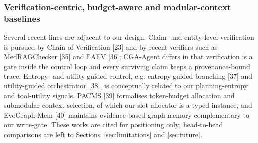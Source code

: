 \documentclass[journal,10pt,a4paper]{IEEEtran}
\begin{document}
\subsubsection{Verification-centric, budget-aware and modular-context baselines}
Several recent lines are adjacent to our design. Claim- and entity-level verification is pursued by Chain-of-Verification [23] and by recent verifiers such as MedRAGChecker [35] and EAEV [36]; CGA-Agent differs in that verification is a gate inside the control loop and every surviving claim keeps a provenance-bound trace. Entropy- and utility-guided control, e.g. entropy-guided branching [37] and utility-guided orchestration [38], is conceptually related to our planning-entropy and tool-utility signals. PACMS [39] formalises token-budget allocation and submodular context selection, of which our slot allocator is a typed instance, and EvoGraph-Mem [40] maintains evidence-based graph memory complementary to our write-gate. These works are cited for positioning only; head-to-head comparisons are left to Sections~\ref{sec:limitations} and \ref{sec:future}.

\begin{table}[t]
\caption{Comparison of Four LLM Agent Architecture Classes}
\label{tab:taxonomy}
\centering
\footnotesize
{}
\end{table}
\end{document}
